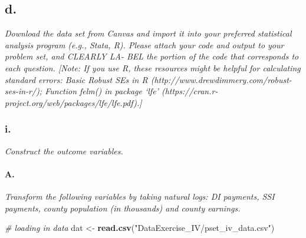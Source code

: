 \documentclass[
]{article}
\newenvironment{Shaded}{\begin{snugshade}}{\end{snugshade}}
\newcommand{\CommentTok}[1]{\textcolor[rgb]{0.56,0.35,0.01}{\textit{#1}}}
\newcommand{\KeywordTok}[1]{\textcolor[rgb]{0.13,0.29,0.53}{\textbf{#1}}}
\newcommand{\NormalTok}[1]{#1}
\newcommand{\OperatorTok}[1]{\textcolor[rgb]{0.81,0.36,0.00}{\textbf{#1}}}
\newcommand{\StringTok}[1]{\textcolor[rgb]{0.31,0.60,0.02}{#1}}
\begin{document}
\hypertarget{d.-3}{%
\subsection{d.~}\label{d.-3}}

\textit{Download the data set from Canvas and import it into your preferred statistical analysis program
(e.g., Stata, R). Please attach your code and output to your problem set, and CLEARLY LA-
BEL the portion of the code that corresponds to each question. [Note: If you use R, these resources
might be helpful for calculating standard errors: Basic Robust SEs in R (http://www.drewdimmery.com/robust-ses-in-r/); Function felm() in package ‘lfe’ (https://cran.r-project.org/web/packages/lfe/lfe.pdf).]}

\hypertarget{i.-2}{%
\subsubsection{i.}\label{i.-2}}

\textit{Construct the outcome variables.}

\hypertarget{a.-5}{%
\paragraph{A.}\label{a.-5}}

\textit{Transform the following variables by taking natural logs: DI payments, SSI payments, county population (in thousands) and county earnings.}

\begin{Shaded}
\begin{Highlighting}[]
\CommentTok{# loading in data}
\NormalTok{dat <-}\StringTok{ }\KeywordTok{read.csv}\NormalTok{(}\StringTok{"DataExercise_IV/pset_iv_data.csv"}\NormalTok{)}
\end{Highlighting}
\end{Shaded}

\begin{Shaded}
\end{Shaded}
\end{document}

